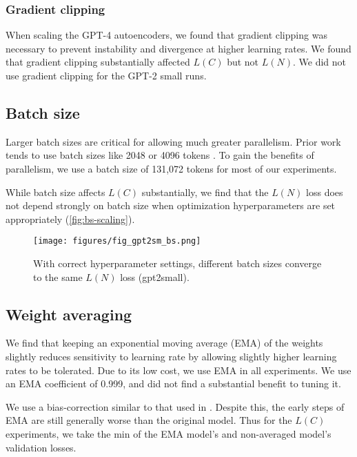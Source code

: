 \subsubsection{Gradient clipping}

When scaling the GPT-4 autoencoders, we found that gradient clipping was necessary to prevent instability and divergence at higher learning rates. %
We found that gradient clipping substantially affected $L(C)$ but not $L(N)$. We did not use gradient clipping for the GPT-2 small runs.

\subsection{Batch size}
\label{sec:batch_size_invariance}

Larger batch sizes are critical for allowing much greater parallelism. Prior work tends to use batch sizes like 2048 or 4096 tokens \citep{bricken2023monosemanticity, conerly2024update, rajamanoharan2024improving}. To gain the benefits of parallelism, we use a batch size of 131,072 tokens for most of our experiments.  %

While batch size affects $L(C)$ substantially, we find that the $L(N)$ loss does not depend strongly on batch size when optimization hyperparameters are set appropriately (\autoref{fig:bs-scaling}).

 



\begin{figure}[ht]
    \centering
    \texttt{[image: figures/fig\_gpt2sm\_bs.png]}
    \caption{With correct hyperparameter settings, different batch sizes converge to the same $L(N)$ loss (gpt2small).}
    \label{fig:bs-scaling}
\end{figure}





\subsection{Weight averaging}

We find that keeping an exponential moving average (EMA) \cite{ruppert1988efficient} of the weights slightly reduces sensitivity to learning rate by allowing slightly higher learning rates to be tolerated. Due to its low cost, we use EMA in all experiments. We use an EMA coefficient of 0.999, and did not find a substantial benefit to tuning it.

We use a bias-correction similar to that used in \citet{kingma2014adam}. Despite this, the early steps of EMA are still generally worse than the original model. Thus for the $L(C)$ experiments, we take the min of the EMA model's and non-averaged model's validation losses.






